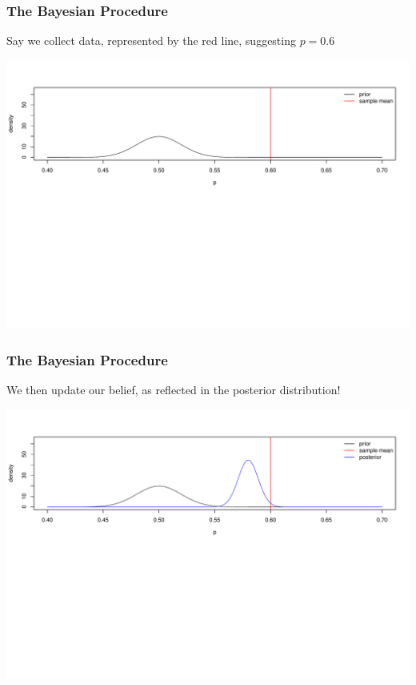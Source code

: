 \documentclass[slides]{beamer}
\newcommand{\blue}[1]{\textcolor{blue2}{#1}}
\begin{document}
\begin{frame}
\frametitle{The Bayesian Procedure}
Say we collect data, represented by the red line, suggesting $p=0.6$
\begin{center}
\includegraphics[width=\textwidth]{figure/bayes2.pdf} 
\end{center}

\end{frame}



\begin{frame}
\frametitle{The Bayesian Procedure}
We then \blue{update} our belief, as reflected in the posterior distribution!
\begin{center}
\includegraphics[width=\textwidth]{figure/bayes3.pdf} 
\end{center}

\end{frame}
\end{document}
